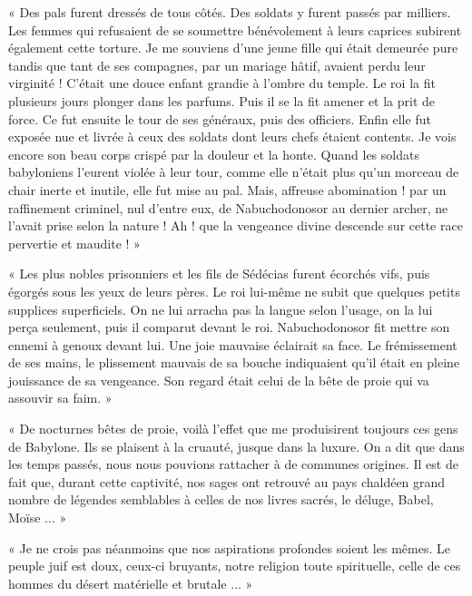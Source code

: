 \documentclass[a4paper, 11pt, oneside, polutonikogreek, french]{article}
\begin{document}
\bigskip
\centerline{\EightStarTaper}
\centerline{\EightStarTaper\EightStarTaper}
\bigskip

« Des pals furent dressés de tous côtés. Des soldats y furent passés par milliers. Les femmes qui refusaient de se soumettre bénévolement à leurs caprices subirent également cette torture. Je me souviens d'une jeune fille qui était demeurée pure tandis que tant de ses compagnes, par un mariage hâtif, avaient perdu leur virginité ! C'était une douce enfant grandie à l'ombre du temple. Le roi la fit plusieurs jours plonger dans les parfums. Puis il se la fit amener et la prit de force. Ce fut ensuite le tour de ses généraux, puis des officiers. Enfin elle fut exposée nue et livrée à ceux des soldats dont leurs chefs étaient contents. Je vois encore son beau corps crispé par la douleur et la honte. Quand les soldats babyloniens l'eurent violée à leur tour, comme elle n'était plus qu'un morceau de chair inerte et inutile, elle fut mise au pal. Mais, affreuse abomination ! par un raffinement criminel, nul d'entre eux, de Nabuchodonosor au dernier archer, ne l'avait prise selon la nature ! Ah ! que la vengeance divine descende sur cette race pervertie et maudite ! »

\bigskip
\centerline{\EightStarTaper}
\centerline{\EightStarTaper\EightStarTaper}
\bigskip

« Les plus nobles prisonniers et les fils de Sédécias furent écorchés vifs, puis égorgés sous les yeux de leurs pères. Le roi lui-même ne subit que quelques petits supplices superficiels. On ne lui arracha pas la langue selon l'usage, on la lui perça seulement, puis il comparut devant le roi. Nabuchodonosor fit mettre son ennemi à genoux devant lui. Une joie mauvaise éclairait sa face. Le frémissement de ses mains, le plissement mauvais de sa bouche indiquaient qu'il était en pleine jouissance de sa vengeance. Son regard était celui de la bête de proie qui va assouvir sa faim. »

« De nocturnes bêtes de proie, voilà l'effet que me produisirent toujours ces gens de Babylone. Ils se plaisent à la cruauté, jusque dans la luxure. On a dit que dans les temps passés, nous nous pouvions rattacher à de communes origines. Il est de fait que, durant cette captivité, nos sages ont retrouvé au pays chaldéen grand nombre de légendes semblables à celles de nos livres sacrés, le déluge, Babel, Moïse ... »

« Je ne crois pas néanmoins que nos aspirations profondes soient les mêmes. Le peuple juif est doux, ceux-ci bruyants, notre religion toute spirituelle, celle de ces hommes du désert matérielle et brutale ... »
\end{document}
